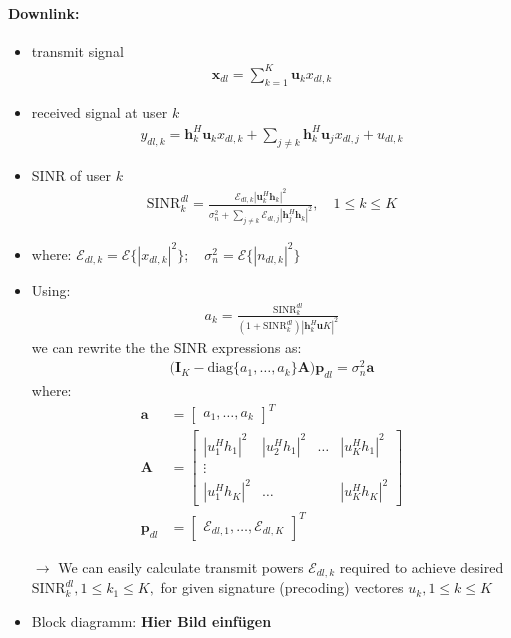 \documentclass[a4paper, 10pt]{article}
\begin{document}
\paragraph{Downlink:}
\begin{itemize}
	\item transmit signal
	\begin{align*}
		\mathbf{x}_{dl} = \sum\limits_{k = 1}^{K}\mathbf{u}_kx_{dl,k}
	\end{align*}
	\item received signal at user $k$
	\begin{align*}
		y_{dl,k} = \mathbf{h}_k^H\mathbf{u}_kx_{dl,k} + \sum\limits_{j \neq k}\mathbf{h}_k^H\mathbf{u}_jx_{dl,j} + u_{dl,k}
	\end{align*}
	\item SINR of user $k$
	\begin{align*}
		\text{SINR}_k^{dl} = \frac{\mathcal{E}_{dl,k}|\mathbf{u}_k^H\mathbf{h}_k|^2}{\sigma_n^2 + \sum\limits_{j \neq k}\mathcal{E}_{dl,j}|\mathbf{h}_j^H\mathbf{h}_k|^2},\quad 1\leq k \leq K
	\end{align*}
	\item where: $\mathcal{E}_{dl,k} = \mathcal{E}\bigl\{|x_{dl,k}|^2 \bigr\}; \quad \sigma_n^2 = \mathcal{E}\bigl\{|n_{dl,k}|^2\bigr\} $
	\item Using: 
	\begin{align*}
		a_k = \frac{\text{SINR}_k^{dl}}{(1 + \text{SINR}_k^{dl})|\mathbf{h}_k^H\mathbf{u}K|^2}
	\end{align*}
	we can rewrite the the SINR expressions as:
	\begin{align*}
		\boxed{\bigl(\mathbf{I}_K - \text{diag}\{a_1, \ldots, a_k\}\mathbf{A}\bigr)\mathbf{p}_{dl} = \sigma_n^2\mathbf{a}}
	\end{align*}
	where:
	\begin{align*}
		\mathbf{a} &= \begin{bmatrix} a_1,\ldots,a_k\end{bmatrix}^T \\
		\mathbf{A} &= 
		\begin{bmatrix}
			|u_1^Hh_1|^2 & |u_2^Hh_1|^2 & \ldots & |u_K^Hh_1|^2	\\
			\vdots \\
			|u_1^Hh_K|^2 & \ldots & & |u_K^Hh_K|^2		
		\end{bmatrix} \\
		\mathbf{p}_{dl} &= 
		\begin{bmatrix}
			\mathcal{E}_{dl,1},\ldots, \mathcal{E}_{dl,K}	
		\end{bmatrix}^T
	\end{align*}
	\item[$\rightarrow$] We can easily calculate transmit powers $\mathcal{E}_{dl,k} $ required to achieve desired $\text{SINR}_k^{dl}, 1\leq k_1\leq K, $ for given signature (precoding) vectores $u_k, 1\leq k\leq K $ 
	\item Block diagramm: \textbf{Hier Bild einf\"ugen}
\end{itemize}
\end{document}
